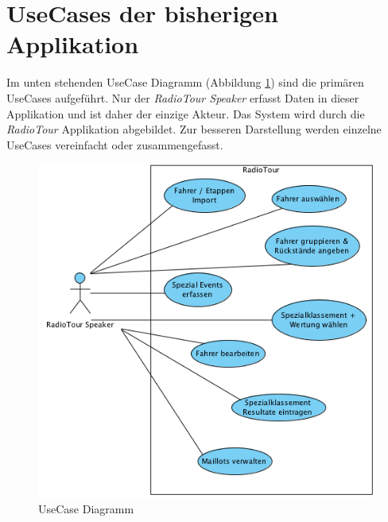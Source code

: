 \section{UseCases der bisherigen Applikation}
\label{ref:usecases}
Im unten stehenden UseCase Diagramm (Abbildung \ref{fig:usecasediagram}) sind die primären UseCases aufgeführt. Nur der \textit{RadioTour Speaker} erfasst Daten in dieser Applikation und ist daher der einzige Akteur. Das System wird durch die \textit{RadioTour} Applikation abgebildet. Zur besseren Darstellung werden einzelne UseCases vereinfacht oder zusammengefasst.
\begin{figure}[h1]
  \caption{UseCase Diagramm}
  \label{fig:usecasediagram}
  \begin{center}
    \includegraphics[scale=0.6]{05bericht/images/usecasediagram.png}
  \end{center}
\end{figure}

